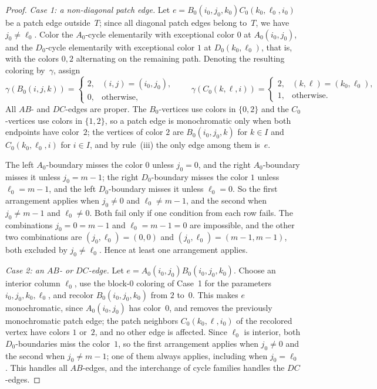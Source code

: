 \documentclass[11pt,letterpaper]{article}
\numberwithin{equation}{section}
\theoremstyle{plain}
\theoremstyle{definition}
\theoremstyle{remark}
\begin{document}
\begin{proof}
\emph{Case 1: a non-diagonal patch edge.}
Let $e=B_0(i_0,j_0,k_0)C_0(k_0,\ell_0,i_0)$ be a patch edge outside~$T$; since all diagonal patch edges belong to~$T$, we have $j_0\ne\ell_0$. Color the $A_0$-cycle elementarily with exceptional color $0$ at $A_0(i_0,j_0)$, and the $D_0$-cycle elementarily with exceptional color $1$ at $D_0(k_0,\ell_0)$, that is, with the colors $0,2$ alternating on the remaining path. Denoting the resulting coloring by~$\gamma$, assign
\begin{equation*}
  \gamma(B_0(i,j,k))=
  \begin{cases}
    2, & (i,j)=(i_0,j_0),\\
    0, & \text{otherwise},
  \end{cases}
  \qquad
  \gamma(C_0(k,\ell,i))=
  \begin{cases}
    2, & (k,\ell)=(k_0,\ell_0),\\
    1, & \text{otherwise}.
  \end{cases}
\end{equation*}
All $AB$- and $DC$-edges are proper. The $B_0$-vertices use colors in $\{0,2\}$ and the $C_0$-vertices use colors in $\{1,2\}$, so a patch edge is monochromatic only when both endpoints have color~$2$; the vertices of color $2$ are $B_0(i_0,j_0,k)$ for $k\in I$ and $C_0(k_0,\ell_0,i)$ for $i\in I$, and by rule~(iii) the only edge among them is~$e$.

The left $A_0$-boundary misses the color $0$ unless $j_0=0$, and the right $A_0$-boundary misses it unless $j_0=m-1$; the right $D_0$-boundary misses the color $1$ unless $\ell_0=m-1$, and the left $D_0$-boundary misses it unless $\ell_0=0$. So the first arrangement applies when $j_0\ne 0$ and $\ell_0\ne m-1$, and the second when $j_0\ne m-1$ and $\ell_0\ne 0$. Both fail only if one condition from each row fails. The combinations $j_0=0=m-1$ and $\ell_0=m-1=0$ are impossible, and the other two combinations are $(j_0,\ell_0)=(0,0)$ and $(j_0,\ell_0)=(m-1,m-1)$, both excluded by $j_0\ne\ell_0$. Hence at least one arrangement applies.

\emph{Case 2: an $AB$- or $DC$-edge.}
Let $e=A_0(i_0,j_0)B_0(i_0,j_0,k_0)$. Choose an interior column $\ell_0$, use the block-$0$ coloring of Case~1 for the parameters $i_0,j_0,k_0,\ell_0$, and recolor $B_0(i_0,j_0,k_0)$ from $2$ to~$0$. This makes $e$ monochromatic, since $A_0(i_0,j_0)$ has color~$0$, and removes the previously monochromatic patch edge; the patch neighbors $C_0(k_0,\ell,i_0)$ of the recolored vertex have colors $1$ or~$2$, and no other edge is affected. Since $\ell_0$ is interior, both $D_0$-boundaries miss the color~$1$, so the first arrangement applies when $j_0\ne 0$ and the second when $j_0\ne m-1$; one of them always applies, including when $j_0=\ell_0$. This handles all $AB$-edges, and the interchange of cycle families handles the $DC$-edges.


\end{proof}
\end{document}
